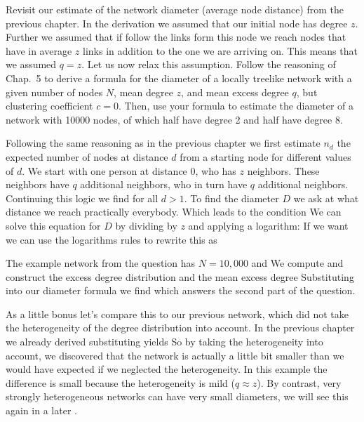Revisit our estimate of the network diameter (average node distance) from the previous chapter. In the derivation we assumed that our initial node has degree $z$. Further we assumed that if follow the links form this node we reach nodes that have in average $z$ links in addition to the one we are arriving on. This means that we assumed $q=z$. Let us now relax this assumption. Follow the reasoning of Chap.~5 to derive a formula for the diameter of a locally treelike network with a given number of nodes $N$, mean degree $z$, and mean excess degree $q$, but clustering coefficient $c=0$. Then, use your formula to estimate the diameter of a network with 10000 nodes, of which half have degree 2 and half have degree 8. 

\solution
Following the same reasoning as in the previous chapter we first estimate $n_d$ the expected number of nodes at distance $d$ from a starting node for different values of $d$.
We start with one person at distance 0, who has $z$ neighbors. These neighbors have $q$ additional neighbors, who in turn have $q$ additional neighbors. Continuing this logic we find
for all $d>1$. To find the diameter $D$ we ask at what distance we reach practically everybody. Which leads to the condition
We can solve this equation for $D$ by dividing by $z$ and applying a logarithm:
If we want we can use the logarithms rules to rewrite this as 

The example network from the question has $N=10,000$ and 
We compute
and construct the excess degree distribution
and the mean excess degree
Substituting into our diameter formula we find 
which answers the second part of the question. 

As a little bonus let's compare this to our previous network, which did not take the heterogeneity of the degree distribution into account. In the previous chapter we already derived 
substituting yields 
So by taking the heterogeneity into account, we discovered that the network is actually a little bit smaller than we would have expected if we neglected the heterogeneity. In this example the difference is small because the heterogeneity is mild ($q\approx z$). By contrast, very strongly heterogeneous networks can have very small diameters, we will see this again in a later . 